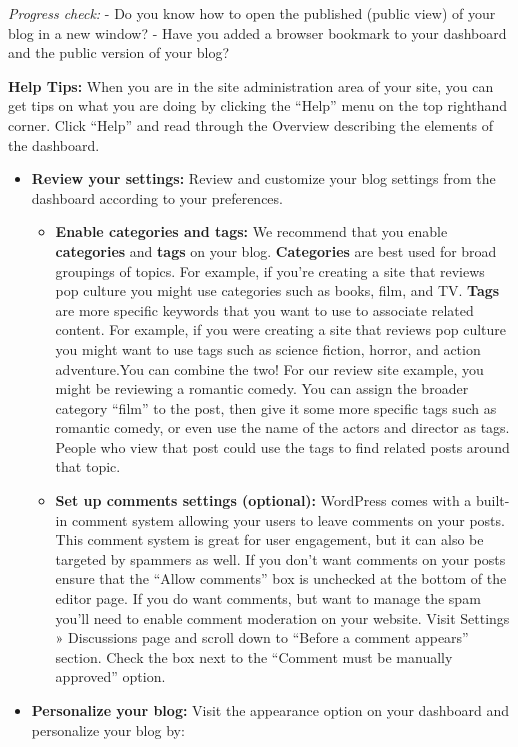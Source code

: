 \documentclass[
  letterpaper,
  DIV=11,
  numbers=noendperiod]{scrreprt}
\providecommand{\tightlist}{%
  \setlength{\itemsep}{0pt}\setlength{\parskip}{0pt}}\usepackage{longtable,booktabs,array}
\begin{document}
\begin{tcolorbox}
\emph{Progress check:} - Do you know how to open the published (public
view) of your blog in a new window? - Have you added a browser bookmark
to your dashboard and the public version of your blog?

\textbf{Help Tips:} When you are in the site administration area of your
site, you can get tips on what you are doing by clicking the ``Help''
menu on the top righthand corner. Click ``Help'' and read through the
Overview describing the elements of the dashboard.

\begin{itemize}
\tightlist
\item
  \textbf{Review your settings:} Review and customize your blog settings
  from the dashboard according to your preferences.

  \begin{itemize}
  \tightlist
  \item
    \textbf{Enable categories and tags:} We recommend that you enable
    \textbf{categories} and \textbf{tags} on your blog.
    \textbf{Categories} are best used for broad groupings of topics. For
    example, if you're creating a site that reviews pop culture you
    might use categories such as books, film, and TV. \textbf{Tags} are
    more specific keywords that you want to use to associate related
    content. For example, if you were creating a site that reviews pop
    culture you might want to use tags such as science fiction, horror,
    and action adventure.You can combine the two! For our review site
    example, you might be reviewing a romantic comedy. You can assign
    the broader category ``film'' to the post, then give it some more
    specific tags such as romantic comedy, or even use the name of the
    actors and director as tags. People who view that post could use the
    tags to find related posts around that topic.
  \item
    \textbf{Set up comments settings (optional):} WordPress comes with a
    built-in comment system allowing your users to leave comments on
    your posts. This comment system is great for user engagement, but it
    can also be targeted by spammers as well. If you don't want comments
    on your posts ensure that the ``Allow comments'' box is unchecked at
    the bottom of the editor page. If you do want comments, but want to
    manage the spam you'll need to enable comment moderation on your
    website. Visit Settings » Discussions page and scroll down to
    ``Before a comment appears'' section. Check the box next to the
    ``Comment must be manually approved'' option.
  \end{itemize}
\item
  \textbf{Personalize your blog:} Visit the appearance option on your
  dashboard and personalize your blog by:


\end{itemize}
\end{tcolorbox}
\end{document}
